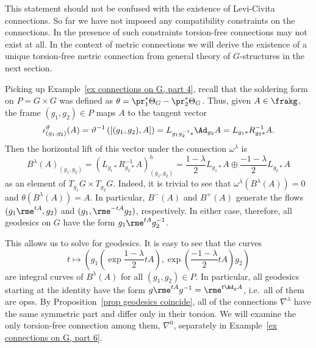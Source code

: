 \begin{rem}
    This statement should not be confused with the existence of Levi-Civita connections. So far we have not imposed any compatibility constraints on the connections. In the presence of such constraints torsion-free connections may not exist at all. In the context of metric connections we will derive the existence of a unique torsion-free metric connection from general theory of $G$-structures in the next section.
\end{rem}

\begin{example}\label{ex connections on G, part 5}
    Picking up Example~\ref{ex connections on G, part 4}, recall that the soldering form on $P=G\times G$ was defined as $\theta=\pr_1^\ast\Theta_G-\pr_2^\ast\Theta_G$. Thus, given $A\in\frakg$, the frame $(g_1,g_2)\in P$ maps $A$ to the tangent vector 
    \[\iota_{(g_1,g_2)}^\vartheta(A)=\vartheta^{-1}\left([(g_1,g_2),A]\right)=L_{g_1g_2^{-1}\ast}\Ad_{g_2}A=L_{g_1\ast}R_{g_2\ast}^{-1}A.\]
    Then the horizontal lift of this vector under the connection $\omega^\lambda$ is 
    \[B^\lambda(A)_{(g_1,g_2)}=(L_{g_1\ast}R_{g_2\ast}^{-1}A)_{(g_1,g_2)}^h=\frac{1-\lambda}{2}L_{g_1\ast}A\oplus \frac{-1-\lambda}{2}L_{g_2\ast}A\]
    as an element of $T_{g_1}G\times T_{g_2}G$. Indeed, it is trivial to see that $\omega^\lambda(B^\lambda(A))=0$ and $\theta(B^\lambda(A))=A$. In particular, $B^-(A)$  and $B^+(A)$ generate the flows $(g_1\rme^{tA},g_2)$ and $(g_1,\rme^{-tA}g_2)$, respectively. In either case, therefore, all geodesics on $G$ have the form $g_1\rme^{tA}g_2^{-1}$. 
    
    This allows us to solve for geodesics. It is easy to see that the curves 
    \[t\mapsto \left(g_1\left(\exp\frac{1-\lambda}{2}tA\right),\exp\left(\frac{-1-\lambda}{2}tA\right)g_2\right)\] 
    are integral curves of $B^\lambda(A)$ for all $(g_1,g_2)\in P$. In particular, all geodesics starting at the identity have the form $g\rme^{tA}g^{-1}=\rme^{t\Ad_g A}$, i.e.\ all of them are \glspl{ops}. By Proposition~\ref{prop geodesics coincide}, all of the connections $\nabla^\lambda$ have the same symmetric part and differ only in their torsion. We will examine the only torsion-free connection among them, $\nabla^0$, separately in Example~\ref{ex connections on G, part 6}.
\end{example}








